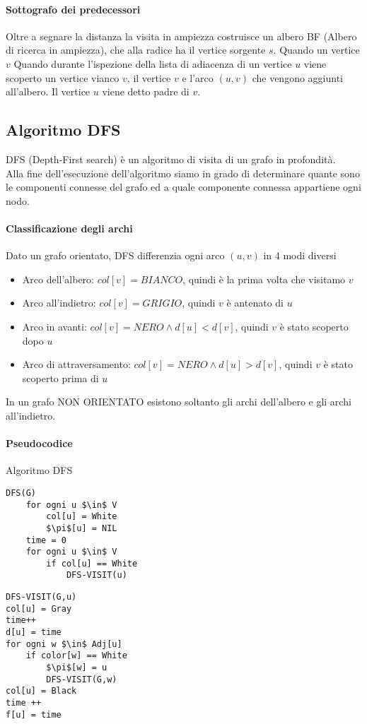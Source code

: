\documentclass[12pt, a4paper, openany]{book}
\begin{document}
\paragraph{Sottografo dei predecessori}
Oltre a segnare la distanza la visita in ampiezza costruisce un albero BF (Albero di ricerca in ampiezza), che alla radice ha il vertice sorgente $s$. Quando un vertice $v$
Quando durante l'ispezione della lista di adiacenza di un vertice $u$ viene scoperto un vertice vianco $v$,
il vertice $v$ e l'arco $(u,v)$ che vengono aggiunti all'albero. Il vertice $u$ viene detto padre di $v$.


\subsection{Algoritmo DFS}
DFS (Depth-First search) è un algoritmo di visita di un grafo in profondità.
\\Alla fine dell'esecuzione dell'algoritmo siamo in grado di determinare quante sono le componenti connesse
del grafo ed a quale componente connessa appartiene ogni nodo.

\paragraph{Classificazione degli archi}
Dato un grafo orientato, DFS differenzia ogni arco $(u,v)$ in 4 modi diversi
\begin{itemize}
	\item Arco dell'albero: $col[v] = BIANCO$, quindi è la prima volta che visitamo $v$
	\item Arco all'indietro: $col[v] = GRIGIO$, quindi $v$ è antenato di $u$
	\item Arco in avanti: $col[v] = NERO \land d[u] < d[v]$, quindi $v$ è stato scoperto dopo $u$
	\item Arco di attraversamento: $col[v] = NERO \land d[u] > d[v]$, quindi $v$ è stato scoperto prima di $u$
\end{itemize}
In un grafo NON ORIENTATO esistono soltanto gli archi dell'albero e gli archi all'indietro.

\paragraph{Pseudocodice} Algoritmo DFS
\begin{lstlisting}[mathescape=true]
DFS(G)
    for ogni u $\in$ V
        col[u] = White
        $\pi$[u] = NIL
    time = 0
    for ogni u $\in$ V
        if col[u] == White
            DFS-VISIT(u)
\end{lstlisting}
\begin{lstlisting}[mathescape=true]
DFS-VISIT(G,u)
col[u] = Gray
time++
d[u] = time
for ogni w $\in$ Adj[u]
    if color[w] == White
        $\pi$[w] = u
        DFS-VISIT(G,w)
col[u] = Black
time ++
f[u] = time    
\end{lstlisting}
\end{document}
